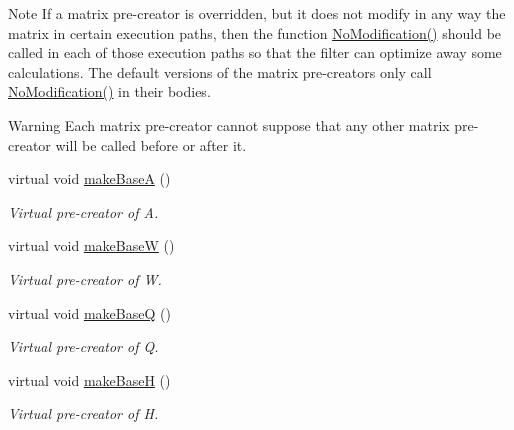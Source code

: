 \begin{Indent}
{\begin{DoxyNote}{Note}
If a matrix pre-\/creator is overridden, but it does not modify in any way the matrix in certain execution paths, then the function {\ttfamily \mbox{\hyperlink{classKalman_1_1EKFilter_ae3350773ed390892c2dd6dfe9dfbca89}{No\+Modification()}}} should be called in each of those execution paths so that the filter can optimize away some calculations. The default versions of the matrix pre-\/creators only call {\ttfamily \mbox{\hyperlink{classKalman_1_1EKFilter_ae3350773ed390892c2dd6dfe9dfbca89}{No\+Modification()}}} in their bodies. 
\end{DoxyNote}
\begin{DoxyWarning}{Warning}
Each matrix pre-\/creator cannot suppose that any other matrix pre-\/creator will be called before or after it. 
\end{DoxyWarning}
}\begin{DoxyCompactItemize}
\item 
\mbox{\label{classKalman_1_1EKFilter_af3eb4846dcdeaf39ab8f54624588a565}} 
virtual void \mbox{\hyperlink{classKalman_1_1EKFilter_af3eb4846dcdeaf39ab8f54624588a565}{make\+BaseA}} ()
\begin{DoxyCompactList}\small\item\em Virtual pre-\/creator of {\itshape A}. \end{DoxyCompactList}\item 
\mbox{\label{classKalman_1_1EKFilter_a6668b0ffe41e701cc44337546d233465}} 
virtual void \mbox{\hyperlink{classKalman_1_1EKFilter_a6668b0ffe41e701cc44337546d233465}{make\+BaseW}} ()
\begin{DoxyCompactList}\small\item\em Virtual pre-\/creator of {\itshape W}. \end{DoxyCompactList}\item 
virtual void \mbox{\hyperlink{classKalman_1_1EKFilter_af996b71b5762e8284226a96c6aac8d87}{make\+BaseQ}} ()
\begin{DoxyCompactList}\small\item\em Virtual pre-\/creator of {\itshape Q}. \end{DoxyCompactList}\item 
\mbox{\label{classKalman_1_1EKFilter_a2acc1502881abeb70155762fe3e3a644}} 
virtual void \mbox{\hyperlink{classKalman_1_1EKFilter_a2acc1502881abeb70155762fe3e3a644}{make\+BaseH}} ()
\begin{DoxyCompactList}\small\item\em Virtual pre-\/creator of {\itshape H}. \end{DoxyCompactList}\item 

\end{DoxyCompactItemize}
\end{Indent}
